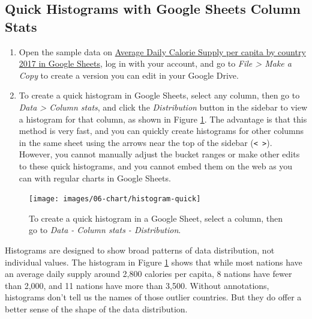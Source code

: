 \documentclass[
  english,
]{book}
\begin{document}
\hypertarget{quick-histograms-with-google-sheets-column-stats}{%
\subsection*{Quick Histograms with Google Sheets Column Stats}\label{quick-histograms-with-google-sheets-column-stats}}

\begin{enumerate}
\def\labelenumi{\arabic{enumi}.}
\item
  Open the sample data on \href{https://docs.google.com/spreadsheets/d/1V-r1bOWpvyCRhmJa0gRZ1TEchXvrr7UTZ97rKOU1WRo/edit\#gid=1132930452}{Average Daily Calorie Supply per capita by country 2017 in Google Sheets}, log in with your account, and go to \emph{File \textgreater{} Make a Copy} to create a version you can edit in your Google Drive.
\item
  To create a quick histogram in Google Sheets, select any column, then go to \emph{Data \textgreater{} Column stats}, and click the \emph{Distribution} button in the sidebar to view a histogram for that column, as shown in Figure \ref{fig:histogram-quick}. The advantage is that this method is very fast, and you can quickly create histograms for other columns in the same sheet using the arrows near the top of the sidebar (\texttt{\textless{}\ \textgreater{}}). However, you cannot manually adjust the bucket ranges or make other edits to these quick histograms, and you cannot embed them on the web as you can with regular charts in Google Sheets.
\end{enumerate}



\begin{figure}
\texttt{[image: images/06-chart/histogram-quick]} \caption{To create a quick histogram in a Google Sheet, select a column, then go to \emph{Data - Column stats - Distribution}.}\label{fig:histogram-quick}
\end{figure}

Histograms are designed to show broad patterns of data distribution, not individual values. The histogram in Figure \ref{fig:histogram-quick} shows that while most nations have an average daily supply around 2,800 calories per capita, 8 nations have fewer than 2,000, and 11 nations have more than 3,500. Without annotations, histograms don't tell us the names of those outlier countries. But they do offer a better sense of the shape of the data distribution.
\end{document}
